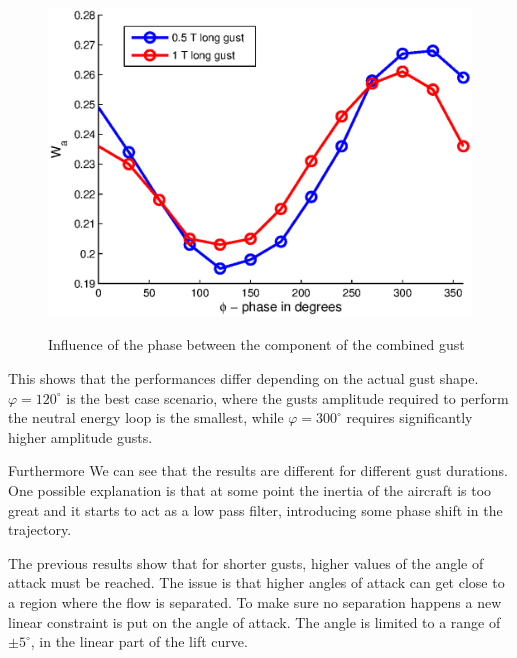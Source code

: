 \begin{figure}[ht]
  \begin{center}
    \scalebox{1.0}
    {\includegraphics{./Figures/combined_gust_amplitude_vs_phase_LUT.eps}}
  \end{center}
  \caption{Influence of the phase between the component of the combined gust}
  \label{fig:combined_amplitude_phase}
\end{figure}

\par This shows that the performances differ depending on the actual gust shape.
$\varphi=120^{\circ}$ is the best case scenario, where the gusts amplitude required to perform the neutral energy loop is the smallest, while $\varphi=300^{\circ}$ requires significantly higher amplitude gusts.

\FloatBarrier

\par Furthermore We can see that the results are different for different gust durations.
One possible explanation is that at some point the inertia of the aircraft is too great and it starts to act as a low pass filter, introducing some phase shift in the trajectory. 

The previous results show that for shorter gusts, higher values of the angle of attack must be reached.
The issue is that higher angles of attack can get close to a region where the flow is separated.
To make sure no separation happens a new linear constraint is put on the angle of attack.
The angle is limited to a range of $\pm 5 ^{\circ}$, in the linear part of the lift curve.


